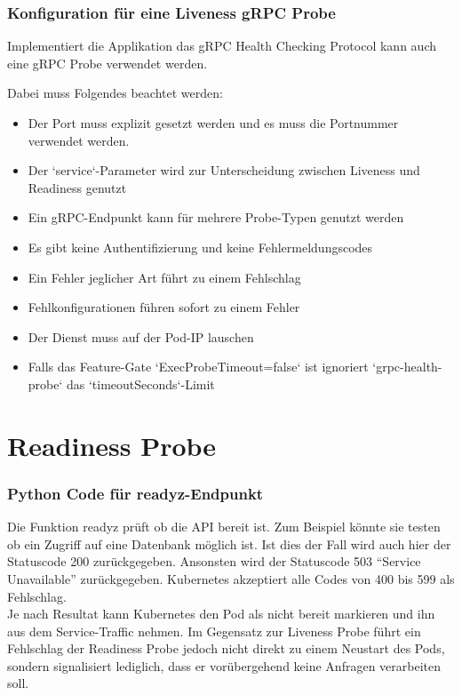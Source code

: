 \subsubsection{Konfiguration für eine Liveness gRPC Probe}
Implementiert die Applikation das gRPC Health Checking Protocol kann auch eine gRPC Probe verwendet werden.

Dabei muss Folgendes beachtet werden:
\begin{itemize}
    \item Der Port muss explizit gesetzt werden und es muss die Portnummer verwendet werden.
    \item Der `service`-Parameter wird zur Unterscheidung zwischen Liveness und Readiness genutzt
    \item Ein gRPC-Endpunkt kann für mehrere Probe-Typen genutzt werden
    \item Es gibt keine Authentifizierung und keine Fehlermeldungscodes
    \item Ein Fehler jeglicher Art führt zu einem Fehlschlag
    \item Fehlkonfigurationen führen sofort zu einem Fehler
    \item Der Dienst muss auf der Pod-IP lauschen
    \item Falls das Feature-Gate `ExecProbeTimeout=false` ist ignoriert `grpc-health-probe` das `timeoutSeconds`-Limit
\end{itemize}
\newpage
\section{Readiness Probe}
\subsubsection{Python Code für readyz-Endpunkt}
Die Funktion readyz prüft ob die API bereit ist. Zum Beispiel könnte sie testen ob ein Zugriff auf eine Datenbank möglich ist. Ist dies der Fall wird auch hier der Statuscode 200 zurückgegeben.
Ansonsten wird der Statuscode 503 \enquote{Service Unavailable} zurückgegeben. Kubernetes akzeptiert alle Codes von 400 bis 599 als Fehlschlag.\\
Je nach Resultat kann Kubernetes den Pod als nicht bereit markieren und ihn aus dem Service-Traffic nehmen. Im Gegensatz zur Liveness Probe führt ein Fehlschlag der Readiness Probe jedoch nicht direkt zu einem Neustart des Pods, sondern signalisiert lediglich, dass er vorübergehend keine Anfragen verarbeiten soll.

